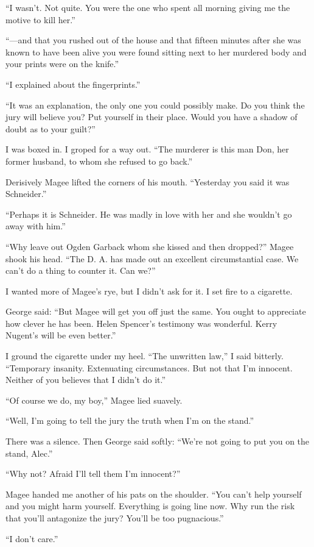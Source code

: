 \documentclass{novel}
\begin{document}
“I wasn’t. Not quite. You were the one who spent all morning giving me the motive to kill her.”

“—and that you rushed out of the house and that fifteen minutes after she was known to have been alive you were found sitting next to her murdered body and your prints were on the knife.”

“I explained about the fingerprints.”

“It was an explanation, the only one you could possibly make. Do you think the jury will believe you? Put yourself in their place. Would you have a shadow of doubt as to your guilt?”

I was boxed in. I groped for a way out. “The murderer is this man Don, her former husband, to whom she refused to go back.”

Derisively Magee lifted the corners of his mouth. “Yesterday you said it was Schneider.”

“Perhaps it is Schneider. He was madly in love with her and she wouldn’t go away with him.”

“Why leave out Ogden Garback whom she kissed and then dropped?” Magee shook his head. “The D. A. has made out an excellent circumstantial case. We can’t do a thing to counter it. Can we?”

I wanted more of Magee’s rye, but I didn’t ask for it. I set fire to a cigarette.

George said: “But Magee will get you off just the same. You ought to appreciate how clever he has been. Helen Spencer’s testimony was wonderful. Kerry Nugent’s will be even better.”

I ground the cigarette under my heel. “The unwritten law,” I said bitterly. “Temporary insanity. Extenuating circumstances. But not that I’m innocent. Neither of you believes that I didn’t do it.”

“Of course we do, my boy,” Magee lied suavely.

“Well, I’m going to tell the jury the truth when I’m on the stand.”

There was a silence. Then George said softly: “We’re not going to put you on the stand, Alec.”

“Why not? Afraid I’ll tell them I’m innocent?”

Magee handed me another of his pats on the shoulder. “You can’t help yourself and you might harm yourself. \mbox{Everything} is going line now. Why run the risk that you’ll antagonize the jury? You’ll be too pugnacious.”

“I don’t care.”
\end{document}
